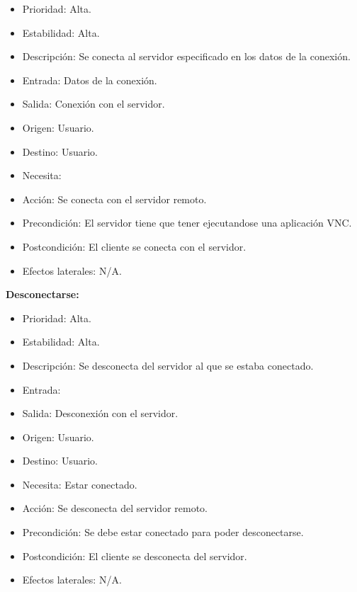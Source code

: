 \begin{itemize}
\item Prioridad: Alta.
\item Estabilidad: Alta.
\item Descripción: Se conecta al servidor especificado en los datos de la conexión.
\item Entrada: Datos de la conexión.
\item Salida: Conexión con el servidor.
\item Origen: Usuario.
\item Destino: Usuario.
\item Necesita:
\item Acción: Se conecta con el servidor remoto.
\item Precondición: El servidor tiene que tener ejecutandose una aplicación VNC.
\item Postcondición: El cliente se conecta con el servidor.
\item Efectos laterales: N/A.\\

\end{itemize}
\newpage
\textbf{Desconectarse:}
\begin{itemize}
\item Prioridad: Alta.
\item Estabilidad: Alta.
\item Descripción: Se desconecta del servidor al que se estaba conectado.
\item Entrada:
\item Salida: Desconexión con el servidor.
\item Origen: Usuario.
\item Destino: Usuario.
\item Necesita: Estar conectado.
\item Acción: Se desconecta del servidor remoto.
\item Precondición: Se debe estar conectado para poder desconectarse.
\item Postcondición: El cliente se desconecta del servidor.
\item Efectos laterales: N/A.\\

\end{itemize}

